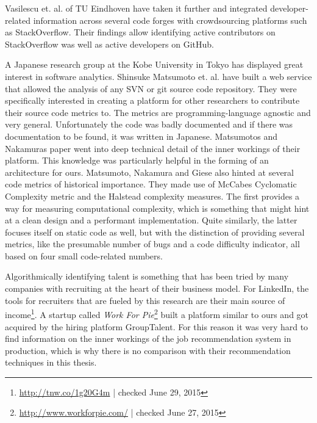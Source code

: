 Vasilescu et. al. of TU Eindhoven have taken it further and integrated developer-related information across several code forges with crowdsourcing platforms such as StackOverflow\cite{vfs:2012}.
Their findings allow identifying active contributors on StackOverflow was well as active developers on GitHub.
\newline

A Japanese research group at the Kobe University in Tokyo has displayed great interest in software analytics\cite{mn:2011}. Shinsuke Matsumoto et. al. have built a web service that allowed the analysis of any SVN or git source code repository. They were specifically interested in creating a platform for other researchers to contribute their source code metrics to. The metrics are programming-language agnostic and very general. Unfortunately the code was badly documented and if there was documentation to be found, it was written in Japanese. Matsumotos and Nakamuras paper went into deep technical detail of the inner workings of their platform. This knowledge was particularly helpful in the forming of an architecture for ours. Matsumoto, Nakamura and Giese also hinted at several code metrics of historical importance. They made use of McCabes Cyclomatic Complexity metric\cite{mc:1976} and the Halstead complexity measures\cite{h:1977}. The first provides a way for measuring computational complexity, which is something that might hint at a clean design and a performant implementation. Quite similarly, the latter focuses itself on static code as well, but with the distinction of providing several metrics, like the presumable number of bugs and a code difficulty indicator, all based on four small code-related numbers.
\newline

Algorithmically identifying talent is something that has been tried by many companies with recruiting at the heart of their business model. For LinkedIn, the tools for recruiters that are fueled by this research are their main source of income\footnote{\url{http://tnw.co/1g20G4m} | checked June 29, 2015}. A startup called \textit{Work For Pie}\footnote{\url{http://www.workforpie.com/} | checked June 27, 2015} built a platform similar to ours and got acquired by the hiring platform GroupTalent. For this reason it was very hard to find information on the inner workings of the job recommendation system in production, which is why there is no comparison with their recommendation techniques in this thesis.

